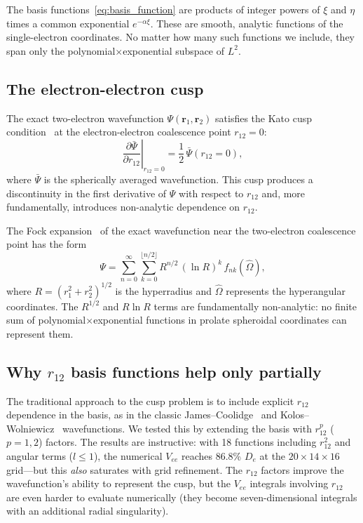 \documentclass[aps,pra,twocolumn,superscriptaddress,longbibliography]{revtex4-2}
\begin{document}
The basis functions~\eqref{eq:basis_function} are products
of integer powers of $\xi$ and $\eta$ times a common
exponential $e^{-\alpha\xi}$.  These are smooth, analytic
functions of the single-electron coordinates.  No matter
how many such functions we include, they span only the
polynomial$\times$exponential subspace of $L^2$.

\subsection{The electron-electron cusp}

The exact two-electron wavefunction $\Psi(\mathbf{r}_1,
\mathbf{r}_2)$ satisfies the Kato cusp condition~\cite{Kato1957}
at the electron-electron coalescence point $r_{12} = 0$:
\begin{equation}
  \left.\frac{\partial\bar{\Psi}}{\partial r_{12}}\right|_{r_{12}=0}
  = \frac{1}{2}\,\bar{\Psi}(r_{12}=0),
  \label{eq:kato}
\end{equation}
where $\bar{\Psi}$ is the spherically averaged wavefunction.
This cusp produces a discontinuity in the first derivative of
$\Psi$ with respect to $r_{12}$ and, more fundamentally,
introduces non-analytic dependence on $r_{12}$.

The Fock expansion~\cite{Fock1954, Morgan1986} of the exact
wavefunction near the two-electron coalescence point has the form
\begin{equation}
  \Psi = \sum_{n=0}^\infty\sum_{k=0}^{\lfloor n/2\rfloor}
    R^{n/2}\,(\ln R)^k\,f_{nk}(\hat{\Omega}),
  \label{eq:fock_expansion}
\end{equation}
where $R = (r_1^2 + r_2^2)^{1/2}$ is the hyperradius and
$\hat{\Omega}$ represents the hyperangular coordinates.  The
$R^{1/2}$ and $R\ln R$ terms are fundamentally non-analytic:
no finite sum of polynomial$\times$exponential functions in
prolate spheroidal coordinates can represent them.

\subsection{Why \texorpdfstring{$r_{12}$}{r12} basis functions
help only partially}

The traditional approach to the cusp problem is to include
explicit $r_{12}$ dependence in the basis, as in the classic
James--Coolidge~\cite{James1933} and Kolos--Wolniewicz~\cite{Kolos1968}
wavefunctions.  We tested this by extending the basis with
$r_{12}^p$ ($p = 1, 2$) factors.  The results are instructive:
with 18 functions including $r_{12}^2$ and angular terms
($l \leq 1$), the numerical $V_{ee}$ reaches 86.8\% $D_e$
at the $20\times 14\times 16$ grid---but this \emph{also}
saturates with grid refinement.  The $r_{12}$ factors improve
the wavefunction's ability to represent the cusp, but the
$V_{ee}$ integrals involving $r_{12}$ are even harder to
evaluate numerically (they become seven-dimensional integrals
with an additional radial singularity).
\end{document}

